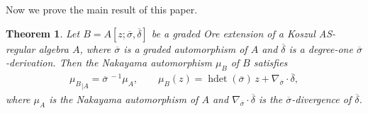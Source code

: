 \documentclass[a4paper,10pt]{amsart}
\newtheorem{theorem}{Theorem}[section]
\theoremstyle{definition}
\numberwithin{equation}{section}
\DeclareMathOperator{\hdet}{hdet}
\begin{document}
Now we prove the main result of this paper.

\begin{theorem}\label{thm: nakayama automorphism of ore extension} Let $B=A[z;\overline{\sigma},\overline{\delta}]$ be a graded Ore extension of a Koszul AS-regular algebra $A$, where $\overline{\sigma}$ is a graded automorphism of $A$ and $\overline{\delta}$ is a degree-one $\overline{\sigma}$-derivation. Then the Nakayama automorphism $\mu_B$ of $B$ satisfies
\begin{align*}
{\mu_{B}}_{\mid A}=\overline{\sigma}^{~-1}\mu_A,\qquad
\mu_B(z)=\hdet(\overline{\sigma})\, z+\nabla_{\overline{\sigma}}\cdot\overline{\delta},
\end{align*}
where $\mu_A$ is the Nakayama automorphism of $A$ and $\nabla_{\overline{\sigma}}\cdot\overline{\delta}$ is the $\overline{\sigma}$-divergence of $\overline{\delta}$.
\end{theorem}
\end{document}
